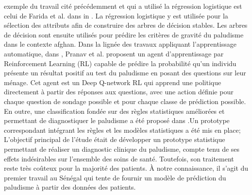 exemple du travail cité précédemment et qui a utilisé la régression logistique est celui de Farida et al. dans in \cite{Ad10}. La régression logistique y est utilisée pour la sélection des attributs afin de construire des arbres de décision stables. Les arbres de décision sont ensuite utilisés pour prédire les critères de gravité du paludisme dans le contexte afghan.
Dans la lignée des travaux appliquant l’apprentissage automatique, dans \cite{Pr17}, Pranav et al. proposent un agent d'apprentissage par Reinforcement Learning  (RL) capable de prédire la probabilité qu'un individu présente un résultat positif au test du paludisme en posant des questions sur leur ménage. Cet agent est un Deep Q-network  RL qui apprend une politique directement à partir des réponses aux questions, avec une action définie pour chaque question de sondage possible et pour chaque classe de prédiction possible. En outre, une classification fondée sur des règles statistiques  améliorées et permettant de diagnostiquer le paludisme a été proposé dans \cite{Bb16}.Un prototype correspondant intégrant les règles et les modèles statistiques a été mis en place; L’objectif principal de l’étude était de développer un prototype statistique permettant de réaliser un diagnostic clinique du paludisme, compte tenu de ses effets indésirables sur l’ensemble des soins de santé. Toutefois, son traitement reste très coûteux pour la majorité des patients.
À notre connaissance, il s’agit du premier travail au Sénégal qui tente de fournir un modèle de prédiction du paludisme à partir des données des patients.

